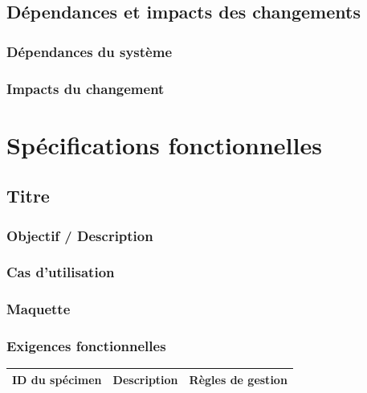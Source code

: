 \documentclass[a4paper,12pt]{report}  %
\begin{document}
	\subsection{Dépendances et impacts des changements}
	\subsubsection{Dépendances du système}
	\lipsum[10]
	
	\subsubsection{Impacts du changement}
	\lipsum[11]

	\pagebreak
	
	\section{Spécifications fonctionnelles}
	\lipsum[12]
	
	\subsection{Titre}
	\subsubsection{Objectif / Description}
	\lipsum[13]
	
	\subsubsection{Cas d'utilisation}
	\lipsum[14]
	
	\subsubsection{Maquette}
	\lipsum[15]
	
	\subsubsection{Exigences fonctionnelles}
	\lipsum[16]
	\begin{longtable}{|l|l|l|}
		\hline
		\textbf{ID du spécimen} & \textbf{Description} & \textbf{Règles de gestion} \\
		\hline
	\end{longtable}
	
\end{document}
